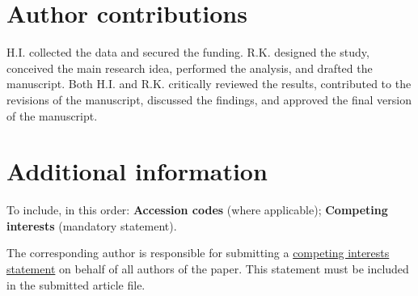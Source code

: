 \documentclass[fleqn,10pt]{wlscirep}
\begin{document}

\section*{Author contributions}
H.I. collected the data and secured the funding. R.K. designed the study, conceived the main research idea, performed the analysis, and drafted the manuscript. Both H.I. and R.K. critically reviewed the results, contributed to the revisions of the manuscript, discussed the findings, and approved the final version of the manuscript.


\section*{Additional information}

To include, in this order: \textbf{Accession codes} (where applicable); \textbf{Competing interests} (mandatory statement). 

The corresponding author is responsible for submitting a \href{http://www.nature.com/srep/policies/index.html#competing}{competing interests statement} on behalf of all authors of the paper. This statement must be included in the submitted article file.
\renewcommand{\thefigure}{S\arabic{figure}}
\setcounter{figure}{0}
\end{document}
